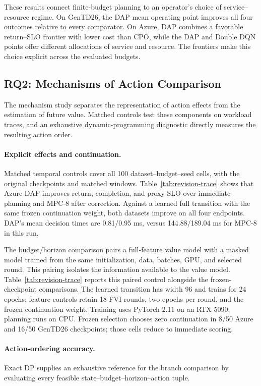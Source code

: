 \documentclass[acmsmall,screen,review,anonymous]{acmart}
\begin{document}
These results connect finite-budget planning to an operator's choice of
service--resource regime. On GenTD26, the DAP mean operating point improves
all four outcomes relative to every comparator. On Azure, DAP combines a
favorable return--SLO frontier with lower cost than CPO, while the DAP and
Double DQN points offer different allocations of service and resource.
The frontiers make this choice explicit across the evaluated budgets.

\subsection{RQ2: Mechanisms of Action Comparison}
\label{sec:mechanisms}

The mechanism study separates the representation of action effects from the
estimation of future value. Matched controls test these components on workload
traces, and an exhaustive dynamic-programming diagnostic directly measures
the resulting action order.

\paragraph{Explicit effects and continuation.}
Matched temporal controls cover all 100 dataset--budget--seed cells,
with the original checkpoints and matched windows. Table~\ref{tab:revision-trace}
shows that Azure DAP improves return, completion, and proxy SLO over immediate
planning and MPC-8 after correction. Against a learned full transition with
the same frozen continuation weight, both datasets improve on all four
endpoints. DAP's mean
decision times are 0.81/0.95 ms, versus 144.88/189.04 ms for MPC-8 in this run.

The budget/horizon comparison pairs a full-feature value model with a masked
model trained from the same initialization, data, batches, GPU, and selected
round. This pairing isolates the information available to the value model. Table~\ref{tab:revision-trace} reports this
paired control alongside the frozen-checkpoint comparisons. The learned
transition has width 96 and trains for 24 epochs; feature controls retain
18 FVI rounds, two epochs per round, and the frozen continuation weight.
Training uses PyTorch 2.11 on an RTX 5090; planning runs on CPU. Frozen selection chooses zero continuation in 8/50 Azure and
16/50 GenTD26 checkpoints; those cells reduce to immediate scoring.



\paragraph{Action-ordering accuracy.}
Exact DP supplies an exhaustive reference for the branch comparison by
evaluating every feasible state--budget--horizon--action tuple.
\end{document}
